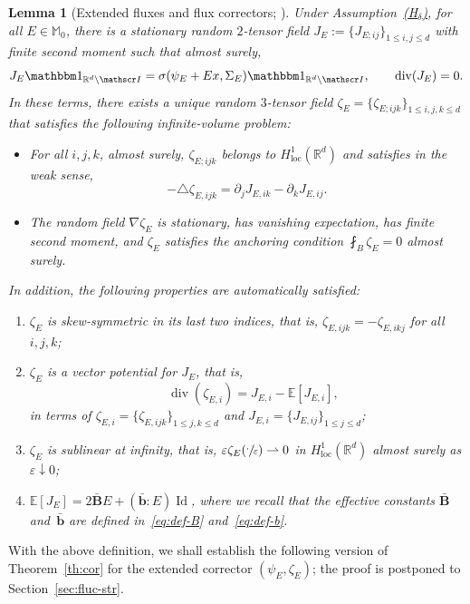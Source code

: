 \documentclass[10pt]{amsart}
\let\mathcal\mathscr
\newcommand{\Hd}{\hyperref[Hd]{\textup{(H$_\delta$)}}\xspace}
\let\mathds\mathbbm
\theoremstyle{plain}
\newtheorem{lem}[theor]{Lemma}
\theoremstyle{definition}
\newcommand{\e}{\varepsilon}
\newcommand{\R}{\mathbb R}
\newcommand{\Ic}{\mathcal I}
\newcommand{\Md}{\mathbb M}
\newcommand{\cvf}{\rightharpoonup}
\newcommand{\loc}{{\operatorname{loc}}}
\newcommand{\Id}{\operatorname{Id}}
\newcommand{\bb}{\bar{\boldsymbol b}}
\newcommand{\Bb}{\bar{\boldsymbol B}}
\newcommand{\Div}{{\operatorname{div}}}
\newcommand{\expec}[1]{\mathbb{E}\left[ #1 \right]}
\begin{document}
\begin{lem}[Extended fluxes and flux correctors; \cite{D-20}]\label{lem:ext-cor}
Under Assumption~\Hd, for all $E\in\Md_0$, there is a stationary random $2$-tensor field $J_E:=\{J_{E;ij}\}_{1\le i,j\le d}$ with finite second moment such that almost surely,
\begin{equation*}\label{eq:def-flux}
J_E\mathds1_{\R^d\setminus\Ic}=\sigma(\psi_E+Ex,\Sigma_E)\mathds1_{\R^d\setminus\Ic},\qquad \Div (J_E)=0.
\end{equation*}
In these terms, there exists a unique random $3$-tensor field $\zeta_E=\{\zeta_{E;ijk}\}_{1\le i,j,k\le d}$ that satisfies the following infinite-volume problem:
\begin{itemize}
\item For all $i,j,k$, almost surely, $\zeta_{E;ijk}$ belongs to $H^1_\loc(\R^d)$ and satisfies in the weak sense,
\begin{equation}\label{eq:def-zeta}
-\triangle \zeta_{E,ijk}=\partial_jJ_{E,ik}-\partial_kJ_{E,ij}.
\end{equation}
\item The random field $\nabla\zeta_E$ is stationary, has vanishing expectation, has finite second moment, and $\zeta_E$ satisfies the anchoring condition $\fint_B\zeta_E=0$ almost surely.
\end{itemize}
In addition, the following properties are automatically satisfied:
\begin{enumerate}\renewcommand{\theenumi}{\roman{enumi}}
\item\label{lem:ext-cori} $\zeta_E$ is skew-symmetric in its last two indices, that is, $\zeta_{E,ijk}=-\zeta_{E,ikj}$ for all $i,j,k$;
\item\label{lem:ext-corii} $\zeta_E$ is a vector potential for $J_E$, that is,
\[\quad\Div (\zeta_{E,i})=J_{E,i}-\expec{J_{E,i}},\]
in terms of $\zeta_{E,i}=\{\zeta_{E,ijk}\}_{1\le j,k\le d}$ and $J_{E,i}=\{J_{E,ij}\}_{1\le j\le d}$;
\item\label{lem:ext-coriii} $\zeta_E$ is sublinear at infinity, that is, $\e\zeta_E(\sfrac\cdot\e)\cvf{}0$ in $H^{1}_\loc(\R^d)$ almost surely as $\e\downarrow0$;
\item\label{lem:ext-coriv} $\expec{J_E}=2\Bb E+(\bb:E)\Id$, where we recall that the effective constants $\Bb$ and~$\bb$ are defined in~\eqref{eq:def-B} and~\eqref{eq:def-b}.
\qedhere
\end{enumerate}
\end{lem}

With the above definition, we shall establish the following version of Theorem~\ref{th:cor} for the extended corrector $(\psi_E,\zeta_E)$; the proof is postponed to Section~\ref{sec:fluc-str}.
\end{document}

